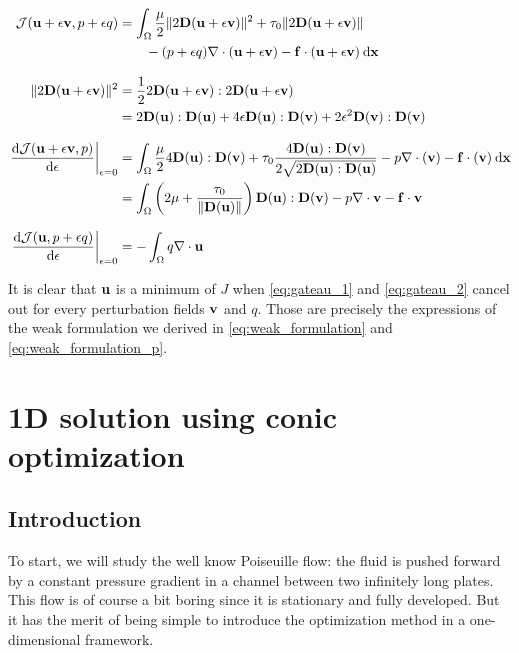 \documentclass[11 pt]{report}
\begin{document}
\begin{align}
    \mathcal{J}(\mathbf{u} + \epsilon \mathbf{v}, p+\epsilon q) &= \int_{\Omega} \frac{\mu}{2} \|2\mathbf{D}(\mathbf{u} + \epsilon \mathbf{v})\|^2 + \tau_0  \|2\mathbf{D}(\mathbf{u} + \epsilon \mathbf{v})\| \\
    &\qquad - (p + \epsilon q) \nabla \cdot (\mathbf{u} + \epsilon \mathbf{v}) - \mathbf{f}\cdot(\mathbf{u} + \epsilon \mathbf{v}) \: \dd \mathbf{x}\\[8pt]
    \|2\mathbf{D}(\mathbf{u} + \epsilon \mathbf{v})\|^2 &= \frac{1}{2} 2\mathbf{D}(\mathbf{u} + \epsilon \mathbf{v}) : 2\mathbf{D}(\mathbf{u} + \epsilon \mathbf{v}) \nonumber \\
    &= 2 \mathbf{D}(\mathbf{u}):\mathbf{D}(\mathbf{u}) + 4\epsilon \mathbf{D}(\mathbf{u}):\mathbf{D}(\mathbf{v}) + 2\epsilon^2 \mathbf{D}(\mathbf{v}):\mathbf{D}(\mathbf{v})\\[8pt]
    \left. \dv{\mathcal{J}(\mathbf{u}+ \epsilon \mathbf{v}, p)}{\epsilon}\right\vert_{\epsilon=0} &= \int_{\Omega} \frac{\mu}{2}   4\mathbf{D}(\mathbf{u}):\mathbf{D}(\mathbf{v}) + \tau_0 \frac{4\mathbf{D}(\mathbf{u}):\mathbf{D}(\mathbf{v})}{2\sqrt{2\mathbf{D}(\mathbf{u}):\mathbf{D}(\mathbf{u})}} - p\nabla\cdot(\mathbf{v}) - \mathbf{f}\cdot(\mathbf{v}) \: \dd \mathbf{x}\nonumber\\
    &= \int_{\Omega} \left(2\mu + \frac{\tau_0}{\|\mathbf{D}(\mathbf{u})\|}\right) \mathbf{D}(\mathbf{u}):\mathbf{D}(\mathbf{v}) - p\nabla\cdot \mathbf{v} - \mathbf{f} \cdot \mathbf{v} \label{eq:gateau_1} \\[8pt]
    \left. \dv{\mathcal{J}(\mathbf{u}, p+\epsilon q)}{\epsilon}\right\vert_{\epsilon=0} &= -\int_{\Omega}q \nabla \cdot \mathbf{u}  \label{eq:gateau_2}
\end{align}

It is clear that $\mathbf{u}$ is a minimum of $J$ when \eqref{eq:gateau_1} and \eqref{eq:gateau_2} cancel out for every perturbation fields $\mathbf{v}$ and $q$. Those are precisely the expressions of the weak formulation we derived in \eqref{eq:weak_formulation} and \eqref{eq:weak_formulation_p}.

\chapter{1D solution using conic optimization}

\section{Introduction}
To start, we will study the well know Poiseuille flow: the fluid is pushed forward by a constant pressure gradient in a channel between two infinitely long plates. This flow is of course a bit boring since it is stationary and fully developed. But it has the merit of being simple to introduce the optimization method in a one-dimensional framework.
\end{document}
